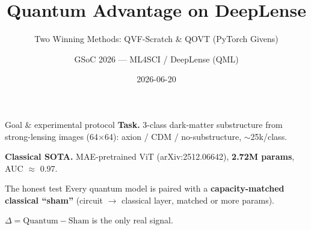 \documentclass[aspectratio=169]{beamer}
\title{Quantum Advantage on DeepLense}
\subtitle{Two Winning Methods: QVF-Scratch \& QOVT (PyTorch Givens)}
\author{GSoC 2026 --- ML4SCI / DeepLense (QML)}
\date{2026-06-20}
\begin{document}
\maketitle

\begin{frame}{Goal \& experimental protocol}
\textbf{Task.} 3-class dark-matter substructure from strong-lensing images (64$\times$64):
axion / CDM / no-substructure, $\sim$25k/class.

\medskip
\textbf{Classical SOTA.} MAE-pretrained ViT (arXiv:2512.06642),
\textbf{2.72M params}, AUC $\approx$ 0.97.

\bigskip
\begin{alertblock}{The honest test}
Every quantum model is paired with a \textbf{capacity-matched classical ``sham''}
(circuit $\to$ classical layer, matched or more params).\\
\medskip
\centerline{$\Delta = \text{Quantum} - \text{Sham}$ \quad is the only real signal.}
\end{alertblock}
\end{frame}
\end{document}
